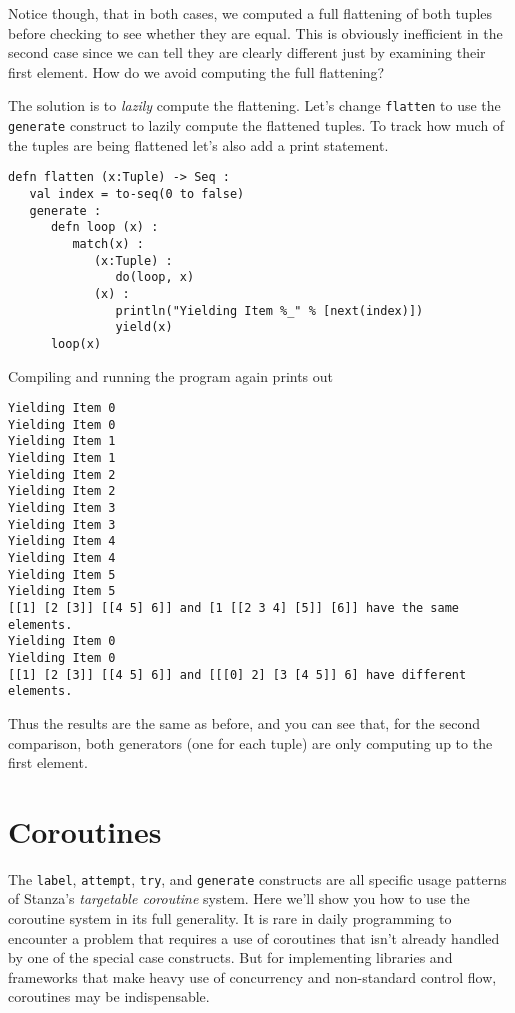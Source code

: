 \documentclass[10pt,oneside]{book}
\begin{document}
Notice though, that in both cases, we computed a full flattening of both tuples before checking to see whether they are equal. This is obviously inefficient in the second case since we can tell they are clearly different just by examining their first element. How do we avoid computing the full flattening?

The solution is to {\em lazily} compute the flattening. Let's change \texttt{\frenchspacing flatten} to use the \texttt{\frenchspacing generate} construct to lazily compute the flattened tuples. To track how much of the tuples are being flattened let's also add a print statement.
\begin{lstlisting}
defn flatten (x:Tuple) -> Seq :
   val index = to-seq(0 to false)
   generate :
      defn loop (x) :
         match(x) :
            (x:Tuple) :
               do(loop, x)
            (x) :
               println("Yielding Item %_" % [next(index)])
               yield(x)
      loop(x)         
\end{lstlisting}
Compiling and running the program again prints out
\begin{lstlisting}
Yielding Item 0
Yielding Item 0
Yielding Item 1
Yielding Item 1
Yielding Item 2
Yielding Item 2
Yielding Item 3
Yielding Item 3
Yielding Item 4
Yielding Item 4
Yielding Item 5
Yielding Item 5
[[1] [2 [3]] [[4 5] 6]] and [1 [[2 3 4] [5]] [6]] have the same elements.
Yielding Item 0
Yielding Item 0
[[1] [2 [3]] [[4 5] 6]] and [[[0] 2] [3 [4 5]] 6] have different elements.
\end{lstlisting}
Thus the results are the same as before, and you can see that, for the second comparison, both generators (one for each tuple) are only computing up to the first element.


\section{Coroutines}
The \texttt{\frenchspacing label}, \texttt{\frenchspacing attempt}, \texttt{\frenchspacing try}, and \texttt{\frenchspacing generate} constructs are all specific usage patterns of Stanza's {\em targetable coroutine} system. Here we'll show you how to use the coroutine system in its full generality. It is rare in daily programming to encounter a problem that requires a use of coroutines that isn't already handled by one of the special case constructs. But for implementing libraries and frameworks that make heavy use of concurrency and non-standard control flow, coroutines may be indispensable. 
\end{document}
